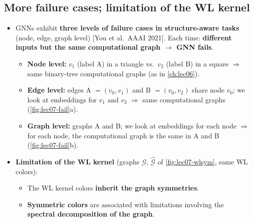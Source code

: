 \subsection{More failure cases; limitation of the WL kernel}\label{sec:lec07-failures}

\begin{itemize}
  \item GNNs exhibit \textbf{three levels of failure cases in structure-aware
    tasks} (node, edge, graph level) [You et al.\ AAAI 2021]. Each time:
    \textbf{different inputs but the same computational graph $\to$ GNN fails}.
    \begin{itemize}
      \item \textbf{Node level:} $v_1$ (label A) in a triangle vs.\ $v_2$ (label
        B) in a square $\Rightarrow$ same binary-tree computational graphs
        (as in \cref{ch:lec06}).
      \item \textbf{Edge level:} edges A $=(v_0,v_1)$ and B $=(v_0,v_2)$ share
        node $v_0$; we look at embeddings for $v_1$ and $v_2$ $\Rightarrow$ same
        computational graphs (\cref{fig:lec07-fail}a).
      \item \textbf{Graph level:} graphs A and B; we look at embeddings for each
        node $\Rightarrow$ for each node, the computational graph is the same in A
        and B (\cref{fig:lec07-fail}b).
    \end{itemize}
  \item \textbf{Limitation of the WL kernel} (graphs $\mathcal{G}$, $\hat{\mathcal{G}}$
    of \cref{fig:lec07-wlsym}, same WL colors):
    \begin{itemize}
      \item The WL kernel colors \textbf{inherit the graph symmetries}.
      \item \textbf{Symmetric colors} are associated with limitations involving the
        \textbf{spectral decomposition of the graph}.
    \end{itemize}
\end{itemize}

